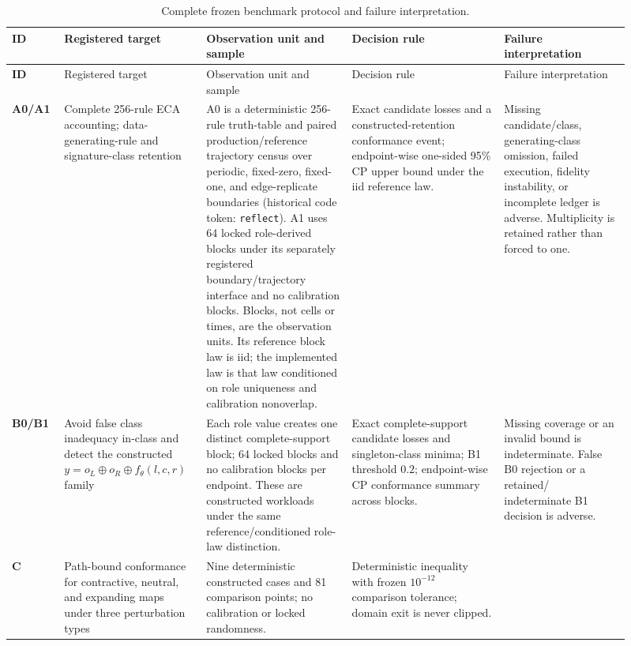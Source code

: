 \begingroup
\scriptsize
\setlength{\tabcolsep}{3pt}
\begin{longtable}{>{\bfseries}p{0.07\linewidth}p{0.20\linewidth}p{0.22\linewidth}
p{0.23\linewidth}p{0.19\linewidth}}
\caption{Complete frozen benchmark protocol and failure interpretation.}\label{tab:full-protocol}\\
\toprule
ID & Registered target & Observation unit and sample & Decision rule & Failure interpretation\\
\midrule
\endfirsthead
\toprule
ID & Registered target & Observation unit and sample & Decision rule & Failure interpretation\\
\midrule
\endhead
A0/A1 & Complete 256-rule ECA accounting; data-generating-rule and signature-class retention &
A0 is a deterministic 256-rule truth-table and paired production/reference trajectory census over
periodic, fixed-zero, fixed-one, and edge-replicate boundaries (historical code token:
\texttt{reflect}). A1 uses 64 locked role-derived blocks under its separately registered
boundary/trajectory interface and no calibration blocks. Blocks, not cells or times, are the
observation units. Its reference block law is iid; the implemented law is that law conditioned on
role uniqueness and calibration nonoverlap. &
Exact candidate losses and a constructed-retention conformance event; endpoint-wise one-sided 95\%
CP upper bound under the iid reference law. &
Missing candidate/class, generating-class omission, failed execution, fidelity instability, or
incomplete ledger is adverse. Multiplicity is retained rather than forced to one.\\
B0/B1 & Avoid false class inadequacy in-class and detect the constructed
\(y=o_L\oplus o_R\oplus f_\theta(l,c,r)\) family &
Each role value creates one distinct complete-support block; 64 locked blocks and no calibration
blocks per endpoint. These are constructed workloads under the same reference/conditioned role-law
distinction. &
Exact complete-support candidate losses and singleton-class minima; B1 threshold \(0.2\);
endpoint-wise CP conformance summary across blocks. &
Missing coverage or an invalid bound is indeterminate. False B0 rejection or a retained/
indeterminate B1 decision is adverse.\\
C & Path-bound conformance for contractive, neutral, and expanding maps under three perturbation
types &
Nine deterministic constructed cases and 81 comparison points; no calibration or locked
randomness. &
Deterministic inequality with frozen \(10^{-12}\) comparison tolerance; domain exit is never
clipped. &

\end{longtable}
